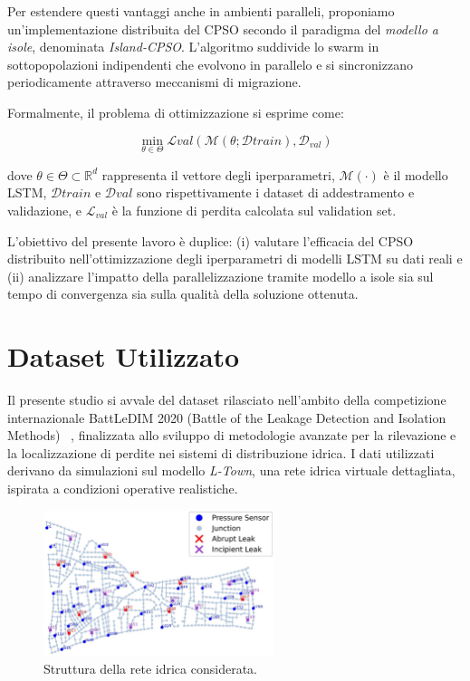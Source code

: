\documentclass{article}
\begin{document}
Per estendere questi vantaggi anche in ambienti paralleli, proponiamo un’implementazione distribuita del 
CPSO secondo il paradigma del \textit{modello a isole}, denominata \textit{Island-CPSO}. L’algoritmo 
suddivide lo swarm in sottopopolazioni indipendenti che evolvono in parallelo e si sincronizzano 
periodicamente attraverso meccanismi di migrazione.

Formalmente, il problema di ottimizzazione si esprime come:

\begin{equation}
\min_{\theta \in \Theta} \mathcal{L}{val}(\mathcal{M}(\theta; \mathcal{D}{train}), \mathcal{D}_{val})
\end{equation}

dove $\theta \in \Theta \subset \mathbb{R}^d$ rappresenta il vettore degli iperparametri, $\mathcal{M}(\cdot)$ è il 
modello LSTM, $\mathcal{D}{train}$ e $\mathcal{D}{val}$ sono rispettivamente i dataset di addestramento e 
validazione, e $\mathcal{L}_{val}$ è la funzione di perdita calcolata sul validation set.

L’obiettivo del presente lavoro è duplice: (i) valutare l’efficacia del CPSO distribuito nell’ottimizzazione degli 
iperparametri di modelli LSTM su dati reali e (ii) analizzare l’impatto della parallelizzazione tramite modello a 
isole sia sul tempo di convergenza sia sulla qualità della soluzione ottenuta.

\section{Dataset Utilizzato}

Il presente studio si avvale del dataset rilasciato nell'ambito della competizione internazionale 
BattLeDIM 2020 (Battle of the Leakage Detection and Isolation Methods) ~\cite{battle2020}, finalizzata allo 
sviluppo di metodologie avanzate per la rilevazione e la localizzazione di perdite nei sistemi di distribuzione 
idrica. I dati utilizzati derivano da simulazioni sul modello \emph{L-Town}, una rete idrica virtuale dettagliata, 
ispirata a condizioni operative realistiche.

\begin{figure}[htbp]
    \centering
    \includegraphics[width=0.6\textwidth]{img/struttura della rete.png}
    \caption{Struttura della rete idrica considerata.}
    \label{fig:network_structure}
\end{figure}
\end{document}
